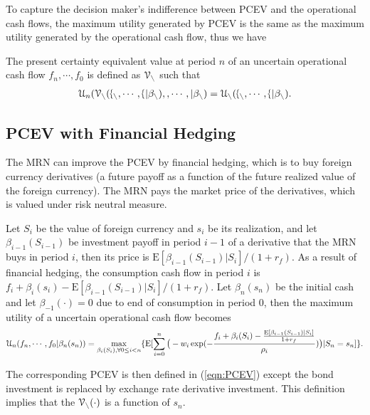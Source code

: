\documentclass[mnsc,nonblindrev,copyedit]{informs2_wz} %
\newcommand{\E}{\mathrm{E}}
\newcommand{\V}{\cal{V}}
\begin{document}
To capture the decision maker's indifference between PCEV and the operational cash flows, the maximum utility generated by PCEV is the same as the maximum utility generated by the operational cash flow, thus we have

\begin{definition}
    \label{def:PCEV}
The present certainty equivalent value at period $n$ of an uncertain operational cash flow $f_n, \cdots, f_0$ is defined as $\V_n$ such that
\begin{eqnarray} 
     \label{eqn:PCEV}
\mathcal{U}_n(\V_n(f_n, \cdots, f_0|\beta_{n}), 0, \cdots, 0|\beta_{n}) = \mathcal{U}_n(f_n, \cdots, f_0|\beta_{n}).
\end{eqnarray}
\end{definition}





\subsection{PCEV with Financial Hedging}

The MRN can improve the PCEV by financial hedging, which is to buy foreign currency derivatives (a future payoff as a function of the future realized value of the foreign currency). The MRN pays the market price of the derivatives, which is valued under risk neutral measure.

Let $S_i$ be the value of foreign currency and $s_i$ be its realization, and let $\beta_{i-1}(S_{i-1})$ be investment payoff in period $i-1$ of a derivative that the MRN buys in period $i$, then its price is $\E[\beta_{i-1}(S_{i-1})|S_i]/(1+r_f)$. As a result of financial hedging, the consumption cash flow in period $i$ is $f_i + \beta_{i}(s_i) - \E[\beta_{i-1} (S_{i-1})|S_i]/(1+r_f)$. Let $\beta_{n}(s_n)$ be the initial cash  and let $\beta_{-1}(\cdot)=0$ due to end of consumption in period $0$, then the maximum utility of a uncertain operational cash flow becomes
\begin{eqnarray} 
    \label{eqn:maxU-FH}
\mathcal{U}_n(f_{n},\cdots,f_0|\beta _{n}(s_n) )  =\max_{\beta_{i}(S_{i}), \forall 0\leq i< n} \{\E [\sum_{i=0}^n \big{(}-w_{i}\exp(-\frac{f_{i} + \beta_{i}(S_i)-\frac{\E[\beta_{i-1}(S_{i-1})|S_i]}{1+r_f}}{\rho_i})\big{)}  |S_n=s_n]\}.
\end{eqnarray}

The corresponding PCEV is then defined in (\ref{eqn:PCEV}) except the bond investment is replaced by exchange rate derivative investment. This definition implies that the $\V_n(\cdot)$ is a function of $s_n$. 
\end{document}

